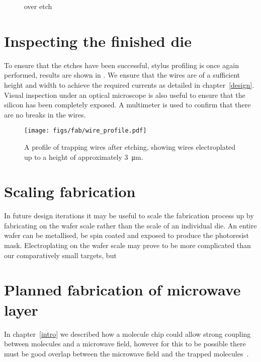 \begin{figure}
  \caption{over etch}
  \label{fab:fig:overetch}
\end{figure}

\section{Inspecting the finished die}

To ensure that the etches have been successful, stylus profiling is once again
performed, results are shown in . We ensure that
the wires are of a sufficient height and width to achieve the required currents
as detailed in chapter~\ref{design}. Visual inspection under an optical
microscope is also useful to ensure that the silicon has been completely
exposed. A multimeter is used to confirm that there are no breaks in the wires.

\begin{figure}
\centering
  \texttt{[image: figs/fab/wire\_profile.pdf]}
  \caption{A profile of trapping wires after etching, showing wires
  electroplated up to a height of approximately \SI{3}{\micro\meter}.
  }
  \label{fab:fig:endprofile}
\end{figure}

\section{Scaling fabrication}

In future design iterations it may be useful to scale the fabrication process
up by fabricating on the wafer scale rather than the scale of an individual
die. An entire wafer can be metallised, be spin coated and exposed to
produce the photoresist mask. Electroplating on the wafer scale may prove to be
more complicated than our comparatively small targets, but 

\section{Planned fabrication of microwave layer}
\label{fab:planned}

In chapter~\ref{intro} 
we described how a molecule chip could allow strong coupling between \CaF{}
molecules and a microwave field, however for this to be possible there must be
good overlap between the microwave field and the trapped
molecules~\cite{Andre2006}.
%

